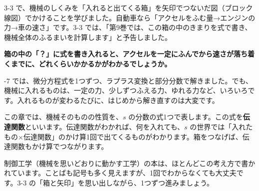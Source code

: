 \begin{hatena}
3-3 で、機械のしくみを「入れると出てくる箱」を矢印でつないだ図（ブロック線図）でかけることを学びました。自動車なら「アクセルをふむ量→エンジンの力→車の速さ」です。3-3 では、「第9巻では、この箱の中のきまりを式で書き、機械全体のふるまいを計算します」と予告しました。
\begin{center}
\end{center}
\textbf{箱の中の「？」に式を書き入れると、アクセルを一定にふんでから速さが落ち着くまでに、どれくらいかかるかがわかるでしょうか。}
\end{hatena}

-7 では、微分方程式を1つずつ、ラプラス変換と部分分数で解きました。でも、機械に入れるものは、一定の力、少しずつふえる力、ゆれる力など、いろいろです。入れるものが変わるたびに、はじめから解き直すのは大変です。

この章では、機械そのものの性質を、$s$ の分数の式1つで表します。この式を\textbf{伝達関数}といいます。伝達関数がわかれば、何を入れても、$s$ の世界では「入れたもの×伝達関数」のかけ算1回で出てくるものがわかります。箱をつなげば、伝達関数もかけ算でつながります。

制御工学（機械を思いどおりに動かす工学）の本は、ほとんどこの考え方で書かれています。ことばも記号も多く見えますが、1回でわからなくても大丈夫です。3-3 の「箱と矢印」を思い出しながら、1つずつ進みましょう。

